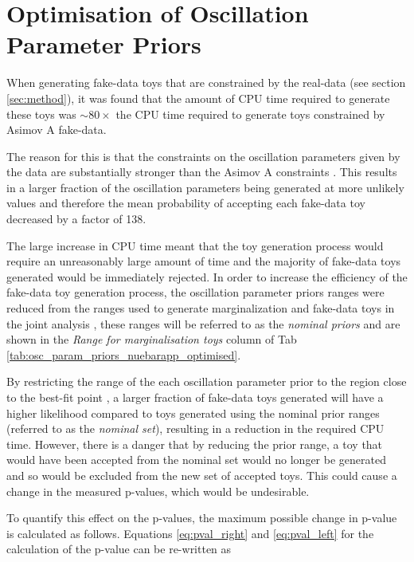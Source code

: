 \section{Optimisation of Oscillation Parameter Priors}\label{app:priors}
When generating fake-data toys that are {\color{red} constrained} by the \RunPeriod real-data (see section \ref{sec:method}), it was found that the amount of CPU time required to generate these toys was $\sim 80\times$ the CPU time required to generate toys {\color{red} constrained} by Asimov A fake-data.

The reason for this is that the constraints on the oscillation parameters given by the \RunPeriod data are substantially stronger than the Asimov A constraints \cite{OurRun18CC1piJointAnalysis3Flavour}. This results in a larger fraction of the oscillation parameters being generated at more unlikely values and therefore the mean probability of accepting each fake-data toy decreased by a factor of 138. 

The large increase in CPU time meant that the toy generation process would require an unreasonably large amount of time and the majority of fake-data toys generated would be immediately rejected. In order to increase the efficiency of the fake-data toy generation process, the oscillation parameter priors ranges were reduced from the ranges used to generate marginalization and fake-data toys in the \RunPeriod joint analysis \cite{OurRun18CC1piJointAnalysis3Flavour}, these ranges will be referred to as the \emph{nominal priors} and are shown in the \emph{Range for marginalisation toys} column of Tab \ref{tab:osc_param_priors_nuebarapp_optimised}.

By restricting the range of the each oscillation parameter prior to the region close to the \RunPeriod best-fit point \cite{OurRun18CC1piJointAnalysis3Flavour}, a larger fraction of fake-data toys generated will have a higher likelihood compared to toys generated using the nominal prior ranges (referred to as the \emph{nominal set}), resulting in a reduction in the required CPU time. However, there is a danger that by reducing the prior range, a toy that would have been accepted from the nominal set would no longer be generated and so would be excluded from the new set of accepted toys. This could cause a change in the measured p-values, which would be undesirable.

To quantify this effect on the p-values, the maximum possible change in p-value is calculated as follows. Equations \ref{eq:pval_right} and \ref{eq:pval_left} for the calculation of the p-value can be re-written as

